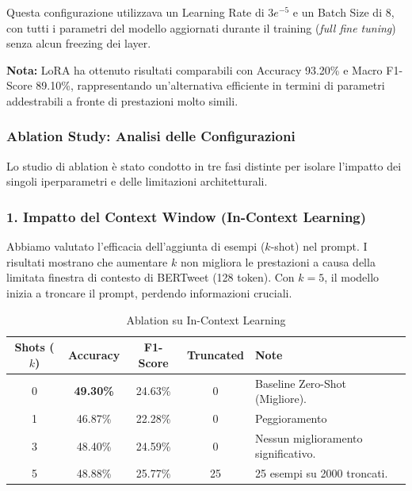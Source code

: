 \documentclass[a4paper,12pt]{article}
\begin{document}
Questa configurazione utilizzava un Learning Rate di $3e^{-5}$ e un Batch Size di 8, con tutti i parametri del modello
aggiornati durante il training (\textit{full fine tuning}) senza alcun freezing dei layer.

\textbf{Nota:} LoRA ha ottenuto risultati comparabili con Accuracy 93.20\% e Macro F1-Score 89.10\%, rappresentando
un'alternativa efficiente in termini di parametri addestrabili a fronte di prestazioni molto simili.
\subsubsection{Ablation Study: Analisi delle Configurazioni}
Lo studio di ablation è stato condotto in tre fasi distinte per isolare l'impatto dei singoli iperparametri e delle limitazioni architetturali.

\subsubsection{1. Impatto del Context Window (In-Context Learning)}
Abbiamo valutato l'efficacia dell'aggiunta di esempi ($k$-shot) nel prompt. I risultati mostrano che aumentare $k$ non migliora le prestazioni a causa della limitata finestra di contesto di BERTweet (128 token). Con $k=5$, il modello inizia a troncare il prompt, perdendo informazioni cruciali.

\begin{table}[H]
    \centering
    \begin{tabular}{|c|c|c|c|l|}
        \hline
        \textbf{Shots ($k$)} & \textbf{Accuracy} & \textbf{F1-Score} & \textbf{Truncated} & \textbf{Note}                       \\
        \hline
        0                    & \textbf{49.30\%}  & 24.63\%           & 0                  & Baseline Zero-Shot (Migliore).      \\
        1                    & 46.87\%           & 22.28\%           & 0                  & Peggioramento                       \\
        3                    & 48.40\%           & 24.59\%           & 0                  & Nessun miglioramento significativo. \\
        5                    & 48.88\%           & 25.77\%           & 25                 & 25 esempi su 2000 troncati.         \\
        \hline
    \end{tabular}
    \caption{Ablation su In-Context Learning}
\end{table}
\end{document}
